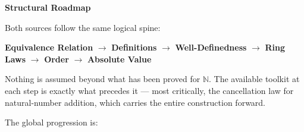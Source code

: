 

\begin{exposition}
\bigskip
\end{exposition}

\noindent\textbf{Structural Roadmap}

\begin{exposition}
\medskip
\end{exposition}
\noindent
\begin{exposition}
Both sources follow the same logical spine:
\end{exposition}

\begin{center}
\textbf{Equivalence Relation}
$\longrightarrow$ \textbf{Definitions}
$\longrightarrow$ \textbf{Well-Definedness}
$\longrightarrow$ \textbf{Ring Laws}
$\longrightarrow$ \textbf{Order}
$\longrightarrow$ \textbf{Absolute Value}
\end{center}

\noindent
\begin{exposition}
Nothing is assumed beyond what has been proved for $\mathbb{N}$.
The available toolkit at each step is exactly what precedes it ---
most critically, the cancellation law for natural-number addition, which
carries the entire construction forward.
\end{exposition}

\begin{exposition}
\medskip
\end{exposition}
\noindent The global progression is:


